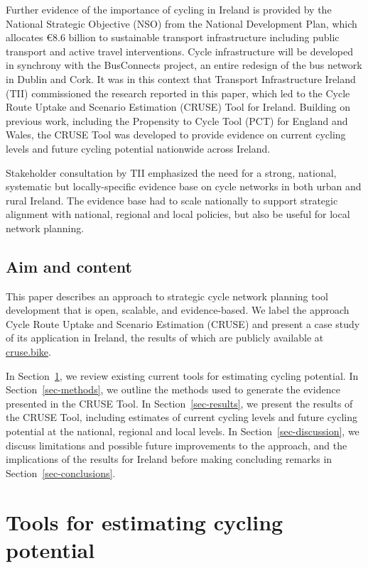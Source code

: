 \documentclass[
  super,
  preprint,
  3p]{elsarticle}
\begin{document}
Further evidence of the importance of cycling in Ireland is provided by
the National Strategic Objective (NSO) from the National Development
Plan, which allocates €8.6 billion to sustainable transport
infrastructure including public transport and active travel
interventions. Cycle infrastructure will be developed in synchrony with
the BusConnects project, an entire redesign of the bus network in Dublin
and Cork. It was in this context that Transport Infrastructure Ireland
(TII) commissioned the research reported in this paper, which led to the
Cycle Route Uptake and Scenario Estimation (CRUSE) Tool for Ireland.
Building on previous work, including the Propensity to Cycle Tool (PCT)
for England and Wales, the CRUSE Tool was developed to provide evidence
on current cycling levels and future cycling potential nationwide across
Ireland.

Stakeholder consultation by TII emphasized the need for a strong,
national, systematic but locally-specific evidence base on cycle
networks in both urban and rural Ireland. The evidence base had to scale
nationally to support strategic alignment with national, regional and
local policies, but also be useful for local network planning.

\subsection{Aim and content}\label{aim-and-content}

This paper describes an approach to strategic cycle network planning
tool development that is open, scalable, and evidence-based. We label
the approach Cycle Route Uptake and Scenario Estimation (CRUSE) and
present a case study of its application in Ireland, the results of which
are publicly available at \href{https://cruse.bike/}{cruse.bike}.

In Section~\ref{sec-tools}, we review existing current tools for
estimating cycling potential. In Section~\ref{sec-methods}, we outline
the methods used to generate the evidence presented in the CRUSE Tool.
In Section~\ref{sec-results}, we present the results of the CRUSE Tool,
including estimates of current cycling levels and future cycling
potential at the national, regional and local levels. In
Section~\ref{sec-discussion}, we discuss limitations and possible future
improvements to the approach, and the implications of the results for
Ireland before making concluding remarks in
Section~\ref{sec-conclusions}.

\section{Tools for estimating cycling potential}\label{sec-tools}
\end{document}

